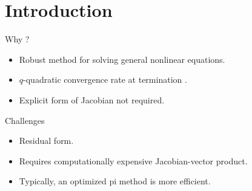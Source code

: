 \section{Introduction}
\label{sec:introduction}

\begin{frame}{Why ?}
  \begin{itemize}
    \item Robust method for solving general nonlinear equations.
    \item $q$-quadratic convergence rate at termination \cite{textbookkelley}.
    \item Explicit form of Jacobian not required.
  \end{itemize}
\end{frame}

\begin{frame}{ Challenges}
  \begin{itemize}
    \item Residual form.
    \item Requires computationally expensive Jacobian-vector product.
    \item Typically, an optimized \gls{pi} method is more efficient.
  \end{itemize}
\end{frame}
